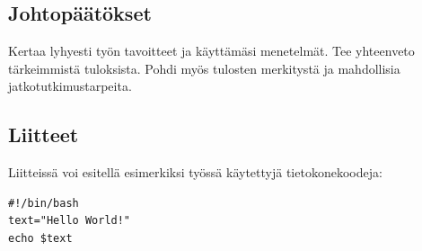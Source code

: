 \documentclass[finnish,twoside,openright,utf]{HYgradu}
\begin{document}
\section{Johtopäätökset}

Kertaa lyhyesti työn tavoitteet ja käyttämäsi menetelmät. Tee yhteenveto tärkeimmistä tuloksista. Pohdi myös tulosten merkitystä ja mahdollisia jatkotutkimustarpeita.

\begin{appendices}
\myappendixtitle

\chapter{Liitteet}
Liitteissä voi esitellä esimerkiksi työssä käytettyjä tietokonekoodeja:
\begin{verbatim}
#!/bin/bash          
text="Hello World!"
echo $text
\end{verbatim}

\end{appendices}


\cleardoublepage %


\end{document}
